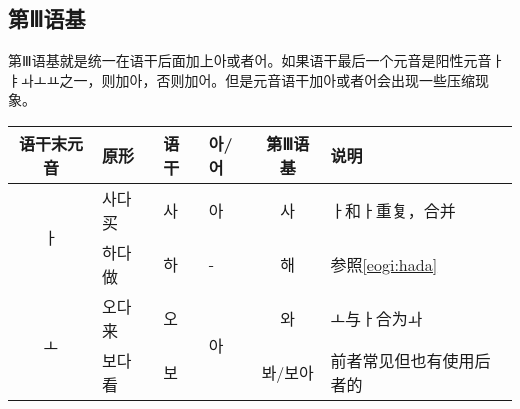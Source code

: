\subsection{第Ⅲ语基}
第Ⅲ语基就是统一在语干后面加上아或者어。如果语干最后一个元音是阳性元音{\kr ㅏㅑㅘㅗㅛ}之一，则加아，否则加어。但是元音语干加아或者어会出现一些压缩现象。\\
\begin{tabular}{|c|l|l|l|c|l|}
    \hline
    语干末元音&原形&语干&아/어&第Ⅲ语基&说明\\\hline
    \multirow{2}{*}{ㅏ}&사다 买&사&아&사&ㅏ和ㅏ重复，合并\\\cline{2-6}
    &하다 做&하&-&해&参照\ref{eogi:hada}\\\hline
    \multirow{2}{*}{ㅗ}&오다 来&오&\multirow{2}{*}{아}&와&ㅗ与ㅏ合为ㅘ\\\cline{2-3}\cline{5-6}
    &보다 看&보&&봐/보아&前者常见但也有使用后者的\\\hline
\end{tabular}\\